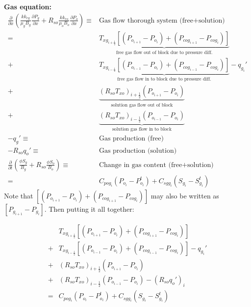 \noindent\textbf{Gas equation:}
\begin{align}
  \nonumber
  \frac{\partial}{\partial x}\left(\frac{kk_{rg}}{\mu_{g}B_{g}}\frac{\partial P_{g}}{\partial x}+R_{so}\frac{kk_{ro}}{\mu_{o}B_{o}}\frac{\partial P_{o}}{\partial x}\right)
  \equiv               & \text{Gas flow thorough system (free+solution)} \\
  \nonumber
  =& \underset{\text{free gas flow out of block due to pressure diff.}}{\underbrace{T_{xg_{i+\frac{1}{2}}}\left[\left(P_{o_{i+1}}-P_{o_{i}}\right)+\left(P_{cog_{i+1}}-P_{cog_{i}}\right)\right]}} \\
  \nonumber
  +& \underset{\text{free gas flow in to block due to pressure diff.}}{\underbrace{T_{xg_{i-\frac{1}{2}}}\left[\left(P_{o_{i-1}}-P_{o_{i}}\right)+\left(P_{cog_{i-1}}-P_{cog_{i}}\right)\right]}}
  -q_{g_{i}}' \\
  \nonumber
  +& \underset{\text{solution gas flow out of block}}{\underbrace{\left(R_{so}T_{xo}\right)_{i+\frac{1}{2}}\left(P_{o_{i+1}}-P_{o_{i}}\right)}} \\
  \nonumber
  +& \underset{\text{solution gas flow in to block}}{\underbrace{\left(R_{so}T_{xo}\right)_{i-\frac{1}{2}}\left(P_{o_{i-1}}-P_{o_{i}}\right)}} \\
  \nonumber
  -q_{g}' \equiv       & \text{Gas production (free)} \\
  \nonumber
  -R_{so}q_{o}' \equiv & \text{Gas production (solution)} \\
  \nonumber
  \frac{\partial}{\partial t}\left(\frac{\phi S_{g}}{B_{g}}+R_{so}\frac{\phi S_{o}}{B_{o}}\right)
  \equiv               & \text{Change in gas content (free+solution)} \\
  \nonumber
  =& C_{pog_{i}}\left(P_{o_{i}}-P_{o_{i}}^{t}\right)+C_{sgg_{i}}\left(S_{g_{i}}-S_{g_{i}}^{t}\right)
\end{align}
Note that $\left[\left(P_{o_{i+1}}-P_{o_{i}}\right)+\left(P_{cog_{i+1}}-P_{cog_{i}}\right)\right]$ may also be written as $\left[P_{g_{i+1}}-P_{g_{i}}\right]$. Then putting it all together:

\begin{align}
  \nonumber
  &T_{xg_{i+\frac{1}{2}}}\left[\left(P_{o_{i+1}}-P_{o_{i}}\right)+\left(P_{cog_{i+1}}-P_{cog_{i}}\right)\right] \\
  \nonumber
  +& T_{xg_{i-\frac{1}{2}}}\left[\left(P_{o_{i-1}}-P_{o_{i}}\right)+\left(P_{cog_{i-1}}-P_{cog_{i}}\right)\right]
  -q_{g_{i}}'\\
  \nonumber
  +& \left(R_{so}T_{xo}\right)_{i+\frac{1}{2}}\left(P_{o_{i+1}}-P_{o_{i}}\right) \\
  \nonumber
  +& \left(R_{so}T_{xo}\right)_{i-\frac{1}{2}}\left(P_{o_{i-1}}-P_{o_{i}}\right) - \left( R_{so}q_{o}' \right)_i  \\
  =& C_{pog_{i}}\left(P_{o_{i}}-P_{o_{i}}^{t}\right)+C_{sgg_{i}}\left(S_{g_{i}}-S_{g_{i}}^{t}\right)
\end{align}

